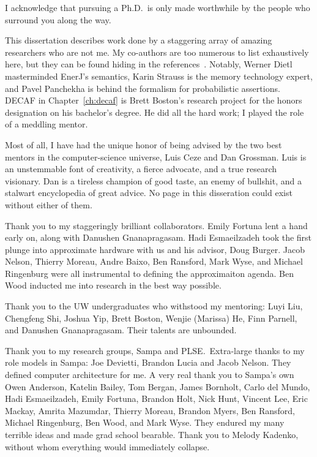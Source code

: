 I acknowledge that pursuing a Ph.D.~is only made worthwhile by the people who
surround you along the way.

This dissertation describes work done by a staggering array of amazing
researchers who are not me.
My co-authors are too numerous to list exhaustively here, but they can be
found hiding in the references~\cite{enerj, decaf, passert, approxstorage}.
Notably, Werner Dietl masterminded EnerJ's semantics,
Karin Strauss is the memory technology expert, and
Pavel Panchekha is behind the formalism for probabilistic assertions.
DECAF in Chapter~\ref{ch:decaf} is Brett Boston's research
project for the honors designation on his bachelor's degree.
He did all the hard work; I played the role of a meddling mentor.

Most of all, I have had the unique honor of being advised by the two best
mentors in the computer-science universe, Luis Ceze and Dan Grossman.
Luis is an unstemmable font of creativity, a fierce advocate, and a true
research visionary.
Dan is a tireless champion of good taste, an enemy of bullshit, and a stalwart
encyclopedia of great advice.
No page in this disseration could exist without either of them.

Thank you to my staggeringly brilliant collaborators.
Emily Fortuna lent a hand early on, along with Danushen Gnanapragasam.
Hadi Esmaeilzadeh took the first plunge into approximate hardware with us and
his advisor, Doug Burger.
Jacob Nelson, Thierry Moreau, Andre Baixo, Ben Ransford, Mark Wyse, and
Michael Ringenburg were all instrumental to defining the approximaiton agenda.
Ben Wood inducted me into research in the best way possible.

Thank you to the UW undergraduates who withstood my mentoring:
Luyi Liu,
Chengfeng Shi,
Joshua Yip,
Brett Boston,
Wenjie (Marissa) He,
Finn Parnell, and
Danushen Gnanapragasam.
Their talents are unbounded.

Thank you to my research groups, Sampa and PLSE.\ Extra-large thanks to
my role models in Sampa: Joe Devietti, Brandon Lucia and Jacob Nelson.
They defined computer architecture for me.
A very real thank you to Sampa's own
Owen Anderson,
Katelin Bailey,
Tom Bergan,
James Bornholt,
Carlo del Mundo,
Hadi Esmaeilzadeh,
Emily Fortuna,
Brandon Holt,
Nick Hunt,
Vincent Lee,
Eric Mackay,
Amrita Mazumdar,
Thierry Moreau,
Brandon Myers,
Ben Ransford,
Michael Ringenburg,
Ben Wood,
and
Mark Wyse.
They endured my many terrible ideas and made grad school bearable.
Thank you to Melody Kadenko, without whom everything would immediately
collapse.


